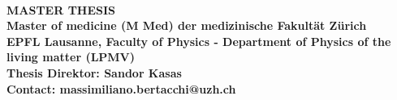 \documentclass[11pt, a4paper]{article}
\begin{document}
\paragraph[center]{\center MASTER THESIS\\
 Master of medicine (M Med) der medizinische Fakultät Zürich\\
EPFL Lausanne, Faculty of Physics - Department of Physics of the living matter (LPMV)\\
Thesis Direktor: Sandor Kasas\\ Contact: massimiliano.bertacchi@uzh.ch\\ }%



%
%

\end{document}
